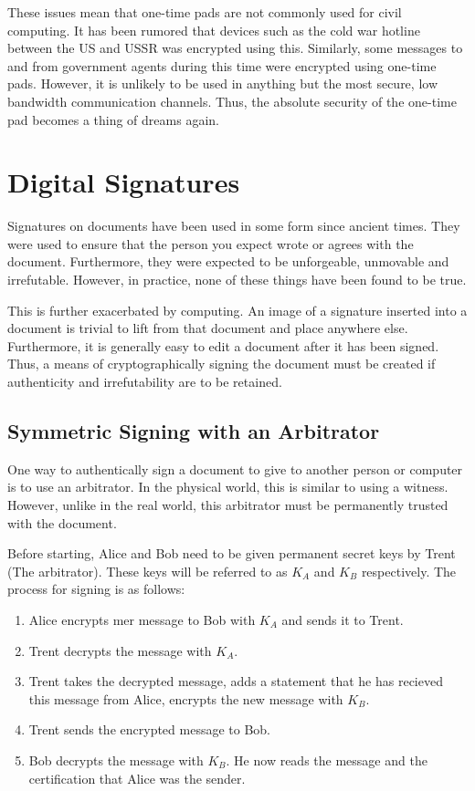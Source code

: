 		These issues mean that one-time pads are not commonly used for civil computing.
		It has been rumored that devices such as the cold war hotline between the US and USSR was encrypted using this.
		Similarly, some messages to and from government agents during this time were encrypted using one-time pads.
		However, it is unlikely to be used in anything but the most secure, low bandwidth communication channels.
		Thus, the absolute security of the one-time pad becomes a thing of dreams again.
	\section{Digital Signatures}
		Signatures on documents have been used in some form since ancient times.
		They were used to ensure that the person you expect wrote or agrees with the document.
		Furthermore, they were expected to be unforgeable, unmovable and irrefutable.
		However, in practice, none of these things have been found to be true.

		This is further exacerbated by computing.
		An image of a signature inserted into a document is trivial to lift from that document and place anywhere else.
		Furthermore, it is generally easy to edit a document after it has been signed.
		Thus, a means of cryptographically signing the document must be created if authenticity and irrefutability are to be retained.

		\subsection{Symmetric Signing with an Arbitrator}
			One way to authentically sign a document to give to another person or computer is to use an arbitrator.
			In the physical world, this is similar to using a witness.
			However, unlike in the real world, this arbitrator must be permanently trusted with the document.

			Before starting, Alice and Bob need to be given permanent secret keys by Trent (The arbitrator).
			These keys will be referred to as $K_A$ and $K_B$ respectively.
			The process for signing is as follows:
			\begin{enumerate}
				\item Alice encrypts mer message to Bob with $K_A$ and sends it to Trent.
				\item Trent decrypts the message with $K_A$.
				\item Trent takes the decrypted message, adds a statement that he has recieved this message from Alice, encrypts the new message with $K_B$.
				\item Trent sends the encrypted message to Bob.
				\item Bob decrypts the message with $K_B$. He now reads the message and the certification that Alice was the sender.
			\end{enumerate}


